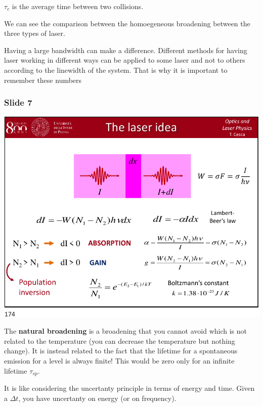 \documentclass[../main/main.tex]{subfiles}
\begin{document}
\( \tau _c \) is the average time between two collisions.

We can see the comparison between the homoegeneous broadening between the three types of laser.

Having a large bandwidth can make a difference. Different methods for having laser working in different ways can be applied to some laser and not to others according to the linewidth of the system. That is why it is important to remember these numbers

\subsubsection*{Slide 7}

\begin{minipage}[]{0.5\linewidth}
\centering
\includegraphics[page=7,width=1\textwidth]{../lessons/pdf_file/09_lecture.pdf}
\end{minipage}
\hspace{0.3cm}\vspace{0.3cm}
\begin{minipage}[c]{0.47\linewidth}

The \textbf{natural broadening} is a broadening that you cannot avoid which is not related to the temperature (you can decrease the temperature but nothing change). It is instead related to the fact that the lifetime for a spontaneous emission for a level is always finite! This would be zero only for an infinite lifetime \( \tau _{sp} \).

It is like considering the uncertanty principle in terms of energy and time. Given a \( \Delta t \), you have uncertanty on energy (or on frequency).

\end{minipage}
\end{document}
